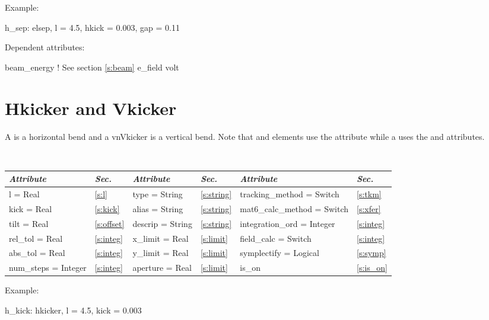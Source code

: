 \vskip0.05in \noindent
Example:
\begin{example}
  h_sep: elsep, l = 4.5, hkick = 0.003, gap = 0.11
\end{example}

\vskip0.05in \noindent
Dependent attributes:
\begin{example}
  beam\_energy  ! See section \ref{s:beam}
  e_field
  volt
\end{example}

\section{Hkicker and Vkicker}
\label{s:hvkicker}

A  is a horizontal bend and a vn{Vkicker} is a vertical
bend.  Note that  and  elements use the
 attribute while a  uses the  and  
attributes.

\toffset
\begin{center}
\tt
\begin{tabular}{|l|l||l|l||l|l|} \hline
  {\sl Attribute} & {\sl Sec.} & {\sl Attribute} & {\sl Sec.} &  {\sl Attribute} & {\sl Sec.} \\ \hline
  l        = Real       & \ref{s:l}       & type = String      & \ref{s:string} & tracking\_method = Switch    & \ref{s:tkm}   \\ \hline
  kick     = Real       & \ref{s:kick}    & alias = String     & \ref{s:string} & mat6\_calc\_method = Switch  & \ref{s:xfer}  \\ \hline
  tilt     = Real       & \ref{s:offset}  & descrip = String   & \ref{s:string} & integration\_ord = Integer   & \ref{s:integ} \\ \hline
  rel\_tol = Real       & \ref{s:integ}   & x\_limit = Real    & \ref{s:limit}  & field\_calc = Switch         & \ref{s:integ} \\ \hline 
  abs\_tol = Real       & \ref{s:integ}   & y\_limit = Real    & \ref{s:limit}  & symplectify = Logical        & \ref{s:symp}  \\ \hline
  num\_steps = Integer  & \ref{s:integ}   & aperture = Real    & \ref{s:limit}  & is\_on                       & \ref{s:is_on} \\ \hline
\end{tabular}
\end{center}
\toffset

\vskip0.05in \noindent
Example:
\begin{example}
  h_kick: hkicker, l = 4.5, kick = 0.003
\end{example}


